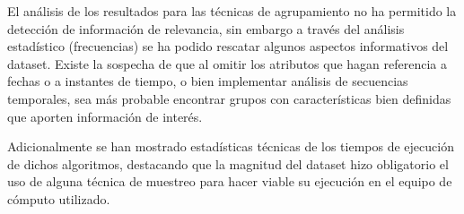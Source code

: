 \documentclass[12pt]{article}
\numberwithin{equation}{section}
\numberwithin{table}{section}
\numberwithin{figure}{section}
\begin{document}
El análisis de los resultados para las técnicas de agrupamiento no ha permitido la detección de información de relevancia, sin embargo a través del análisis estadístico (frecuencias) se ha podido rescatar algunos aspectos informativos del dataset.
Existe la sospecha de que al omitir los atributos que hagan referencia a fechas o a instantes de tiempo, o bien implementar análisis de secuencias temporales, sea más probable encontrar grupos con características bien definidas que aporten información de interés.

Adicionalmente se han mostrado estadísticas técnicas de los tiempos de ejecución de dichos algoritmos, destacando que la magnitud del dataset hizo obligatorio el uso de alguna técnica de muestreo para hacer viable su ejecución en el equipo de cómputo utilizado.
\end{document}
